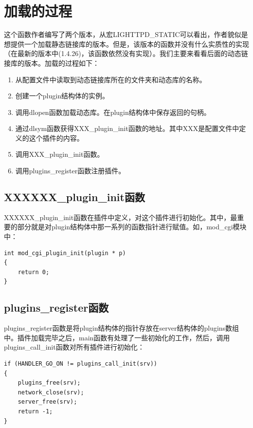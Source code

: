 \documentclass[12pt, dvipdfm]{book}
\begin{document}
\section{加载的过程}
这个函数作者编写了两个版本，从宏LIGHTTPD\_STATIC可以看出，作者貌似是想提供一个加载静态链接库的版本。但是，该版本的函数并没有什么实质性的实现（在最新的版本中(1.4.26)，该函数依然没有实现）。我们主要来看看后面的动态链接库的版本。加载的过程如下：
\begin{enumerate}
	\item 从配置文件中读取到动态链接库所在的文件夹和动态库的名称。
	\item 创建一个plugin结构体的实例。
	\item 调用dlopen函数加载动态库。在plugin结构体中保存返回的句柄。
	\item 通过dlsym函数获得XXX\_plugin\_init函数的地址。其中XXX是配置文件中定义的这个插件的内容。
	\item 调用XXX\_plugin\_init函数。
	\item 调用plugins\_register函数注册插件。
\end{enumerate}

\subsection{XXXXXX\_plugin\_init函数}
XXXXXX\_plugin\_init函数在插件中定义，对这个插件进行初始化。其中，最重要的部分就是对plugin结构体中那一系列的函数指针进行赋值。如，mod\_cgi模块中：

\begin{verbatim}
int mod_cgi_plugin_init(plugin * p)
{
	return 0;
}
\end{verbatim}


\subsection{plugins\_register函数}
plugins\_register函数是将plugin结构体的指针存放在server结构体的plugins数组中。插件加载完毕之后，main函数有处理了一些初始化的工作，然后，调用plugins\_call\_init函数对所有插件进行初始化：

\begin{verbatim}
if (HANDLER_GO_ON != plugins_call_init(srv)) 
{
	plugins_free(srv);
	network_close(srv);
	server_free(srv);
	return -1;
}
\end{verbatim}
\end{document}
